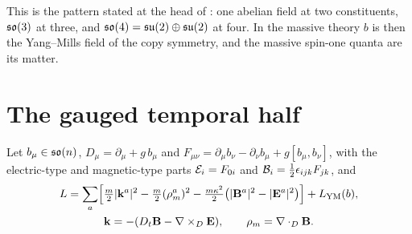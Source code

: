 This is the pattern stated at the head of : one abelian field at two constituents, $\mathfrak{so}(3)$ at three, and
$\mathfrak{so}(4)=\mathfrak{su}(2)\oplus\mathfrak{su}(2)$ at four. In the massive theory $b$ is then the Yang--Mills field of the copy symmetry, and the massive spin-one
quanta are its matter.

\section{The gauged temporal half}

Let $b_\mu\in\mathfrak{so}(n)$, $D_\mu=\partial_\mu+g\,b_\mu$ and $F_{\mu\nu}=\partial_\mu b_\nu-\partial_\nu b_\mu+g[b_\mu,b_\nu]$, with the
electric-type and magnetic-type parts $\mathcal E_i=F_{0i}$ and $\mathcal B_i=\tfrac12\epsilon_{ijk}F_{jk}$, and
\begin{equation}
\label{eq:Lgauged}
\begin{gathered}
L=\sum_a\Bigl[\tfrac m2|\mathbf k^a|^2-\tfrac m2(\rho_m^a)^2-\tfrac{m\kappa^2}2\bigl(|\mathbf B^a|^2-|\mathbf E^a|^2\bigr)\Bigr]+L_{\rm YM}(b),\\
\mathbf k=-(D_t\mathbf B-\nabla\times_D\mathbf E),\qquad \rho_m=\nabla\cdot_D\mathbf B .
\end{gathered}
\end{equation}

